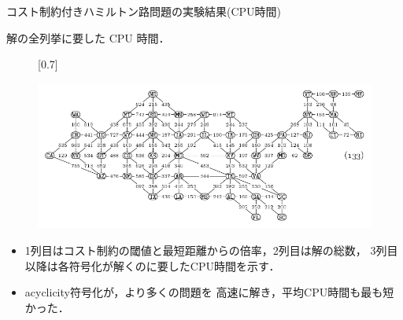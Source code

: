 \documentclass[dvipdfmx,10pt]{beamer}
\begin{document}
\begin{frame}{コスト制約付きハミルトン路問題の実験結果(CPU時間)}

\begin{block}{}
  \centering
  解の全列挙に要した CPU 時間．
\end{block}

\begin{figure}[h]
  \def\@captype{table}
  \begin{minipage}[c]{.48\textwidth}
    \begin{center}
      \scalebox{0.7}[0.7]{
        
      }
    \end{center}

  \end{minipage}
  \hfill
  \begin{minipage}[c]{.48\textwidth}
    \raggedleft
    \includegraphics[width=0.7\linewidth]{fig/taocp_vol4fasc1b_p52_eq133.pdf}
  \end{minipage}
\end{figure}
  
\begin{itemize}
\item 1列目はコスト制約の閾値と最短距離からの倍率，2列目は解の総数，
  3列目以降は各符号化が解くのに要したCPU時間を示す．
\item \textsf{acyclicity}符号化が，より多くの問題を
  高速に解き，平均CPU時間も最も短かった．
\end{itemize}
    
\end{frame}
\end{document}
